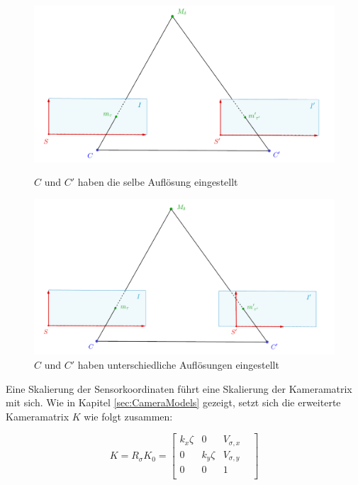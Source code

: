 \begin{figure}[!htb]
	\includegraphics[width=\linewidth]{images/SensorSelbeAufloesung_beschriftet.png}
	\caption{$C$ und $C'$ haben die selbe Auflösung eingestellt}
	\label{fig:Aufl1}
	\endminipage\hfill
	\includegraphics[width=\linewidth]{images/SensorUnterschiedlicheAufloesung_beschriftet.png}
	\caption{$C$ und $C'$ haben unterschiedliche Auflösungen eingestellt}
	\label{fig:Aufl2}
	\endminipage\hfill
\end{figure}


Eine Skalierung der Sensorkoordinaten führt eine Skalierung der Kameramatrix mit sich. Wie in Kapitel \ref{sec:CameraModels} gezeigt, setzt sich die erweiterte Kameramatrix $K$ wie folgt zusammen:

\begin{equation}
K=	R_\sigma K_0=  \begin{bmatrix}
k_x \zeta & 0 & V_{\sigma,x}\\
0 & k_y \zeta & V_{\sigma,y}\\
0 & 0   & 1 &\\
\end{bmatrix}
\end{equation}

